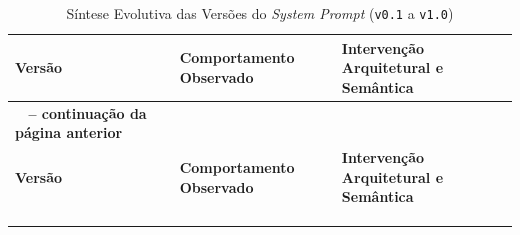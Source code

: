 \noindent
{
\footnotesize 
\renewcommand{\arraystretch}{1.1}
\setlength{\LTleft}{0pt}
\setlength{\LTright}{0pt}

\begin{xltabular}{\textwidth}{|>{\raggedright\arraybackslash}p{2.6cm}|>{\raggedright\arraybackslash}p{4.0cm}|X|}
    \caption{Síntese Evolutiva das Versões do \textit{System Prompt} (\texttt{v0.1} a \texttt{v1.0})}
    \label{tab:evolucao_prompts} \\
    \toprule
    \textbf{Versão} & \textbf{Comportamento Observado} & \textbf{Intervenção Arquitetural e Semântica} \\
    \midrule
    \endfirsthead

    {{\bfseries \tablename\ \thetable{} -- continuação da página anterior}} \\
    \toprule
    \textbf{Versão} & \textbf{Comportamento Observado} & \textbf{Intervenção Arquitetural e Semântica} \\
    \midrule
    \endhead

    \midrule {} \\
    \endfoot

    \bottomrule
     \\
    \endlastfoot
    

\end{xltabular}}
